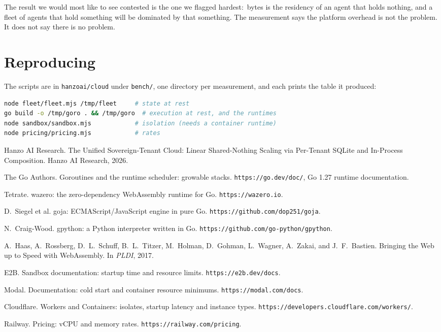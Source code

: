 The result we would most like to see contested is the one we flagged hardest:
\rGoPer{}\,bytes is the residency of an agent that holds nothing, and a fleet of
agents that hold something will be dominated by that something. The measurement
says the platform overhead is not the problem. It does not say there is no
problem.

\section*{Reproducing}

The scripts are in \texttt{hanzoai/cloud} under \texttt{bench/}, one directory
per measurement, and each prints the table it produced:

\begin{lstlisting}[language=bash]
node fleet/fleet.mjs /tmp/fleet     # state at rest
go build -o /tmp/goro . && /tmp/goro  # execution at rest, and the runtimes
node sandbox/sandbox.mjs            # isolation (needs a container runtime)
node pricing/pricing.mjs            # rates
\end{lstlisting}

\begin{thebibliography}{9}

Hanzo AI Research.
\newblock The Unified Sovereign-Tenant Cloud: Linear Shared-Nothing Scaling via
  Per-Tenant SQLite and In-Process Composition.
\newblock Hanzo AI Research, 2026.

The Go Authors.
\newblock Goroutines and the runtime scheduler: growable stacks.
\newblock \texttt{https://go.dev/doc/}, Go 1.27 runtime documentation.

Tetrate.
\newblock wazero: the zero-dependency WebAssembly runtime for Go.
\newblock \texttt{https://wazero.io}.

D.~Siegel et al.
\newblock goja: ECMAScript/JavaScript engine in pure Go.
\newblock \texttt{https://github.com/dop251/goja}.

N.~Craig-Wood.
\newblock gpython: a Python interpreter written in Go.
\newblock \texttt{https://github.com/go-python/gpython}.

A.~Haas, A.~Rossberg, D.~L.~Schuff, B.~L.~Titzer, M.~Holman, D.~Gohman,
  L.~Wagner, A.~Zakai, and J.~F.~Bastien.
\newblock Bringing the Web up to Speed with WebAssembly.
\newblock In \emph{PLDI}, 2017.

E2B.
\newblock Sandbox documentation: startup time and resource limits.
\newblock \texttt{https://e2b.dev/docs}.

Modal.
\newblock Documentation: cold start and container resource minimums.
\newblock \texttt{https://modal.com/docs}.

Cloudflare.
\newblock Workers and Containers: isolates, startup latency and instance types.
\newblock \texttt{https://developers.cloudflare.com/workers/}.

Railway.
\newblock Pricing: vCPU and memory rates.
\newblock \texttt{https://railway.com/pricing}.

\end{thebibliography}
